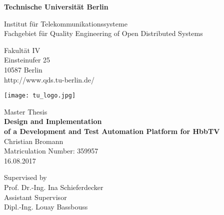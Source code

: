 \thispagestyle{empty}
\begin{center}

\vspace*{0.5cm}
{\LARGE \textbf{Technische Universität Berlin}}

\vspace{0.5cm}

{\large Institut für Telekommunikationssysteme\\[1mm]}
{\large Fachgebiet für Quality Engineering of Open Distributed Systems\\[5mm]}

Fakultät IV\\
Einsteinufer 25\\
10587 Berlin\\
http://www.qds.tu-berlin.de/\\

\vspace*{1cm}

\texttt{[image: tu\_logo.jpg]}

\vspace*{1.0cm}

{\LARGE Master Thesis}\\

\vspace{1.0cm}
{\LARGE \textbf{Design and Implementation}}\\
{\LARGE \textbf{of a Development and Test Automation Platform for HbbTV}}\\
\vspace*{1.0cm}
{\LARGE Christian Bromann}
\\
\vspace*{0.5cm}
Matriculation Number: 359957\\
16.08.2017\\ %
\vspace*{1.0cm}

Supervised by\\
Prof. Dr.-Ing. Ina Schieferdecker\\
\vspace*{0.5cm}
Assistant Supervisor\\
Dipl.-Ing. Louay Bassbouss
\vspace{3cm}


\end{center}
